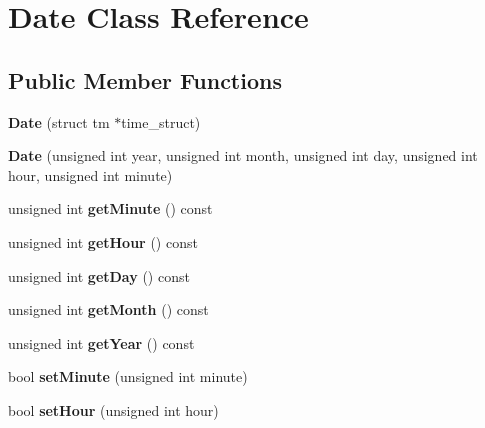 \hypertarget{class_date}{\section{Date Class Reference}
\label{class_date}
}
\subsection*{Public Member Functions}
\begin{DoxyCompactItemize}
\item 
\hypertarget{class_date_ac4860b7b498e1f4142c1d3cde0195fdc}{{\bfseries Date} (struct tm $\ast$time\+\_\+struct)}\label{class_date_ac4860b7b498e1f4142c1d3cde0195fdc}

\item 
\hypertarget{class_date_a8aff6457db8347405876084c651e4361}{{\bfseries Date} (unsigned int year, unsigned int month, unsigned int day, unsigned int hour, unsigned int minute)}\label{class_date_a8aff6457db8347405876084c651e4361}

\item 
\hypertarget{class_date_ac770a597c5db01c15f5909d30ecc614d}{unsigned int {\bfseries get\+Minute} () const }\label{class_date_ac770a597c5db01c15f5909d30ecc614d}

\item 
\hypertarget{class_date_a7ec01c802e7fa66d0a3d301f14541de4}{unsigned int {\bfseries get\+Hour} () const }\label{class_date_a7ec01c802e7fa66d0a3d301f14541de4}

\item 
\hypertarget{class_date_a254204c492d3ebc26a2c62d532e34844}{unsigned int {\bfseries get\+Day} () const }\label{class_date_a254204c492d3ebc26a2c62d532e34844}

\item 
\hypertarget{class_date_ac471b901531b7a1e73809918bac8c1ec}{unsigned int {\bfseries get\+Month} () const }\label{class_date_ac471b901531b7a1e73809918bac8c1ec}

\item 
\hypertarget{class_date_a6561cf495bd6b7e6c747420d7ae9cc12}{unsigned int {\bfseries get\+Year} () const }\label{class_date_a6561cf495bd6b7e6c747420d7ae9cc12}

\item 
\hypertarget{class_date_a714d7a4b5af1ab06b4f99b90f2ffe589}{bool {\bfseries set\+Minute} (unsigned int minute)}\label{class_date_a714d7a4b5af1ab06b4f99b90f2ffe589}

\item 
\hypertarget{class_date_a45df391c8b5da977bd4662b81c0cd839}{bool {\bfseries set\+Hour} (unsigned int hour)}\label{class_date_a45df391c8b5da977bd4662b81c0cd839}


\end{DoxyCompactItemize}
